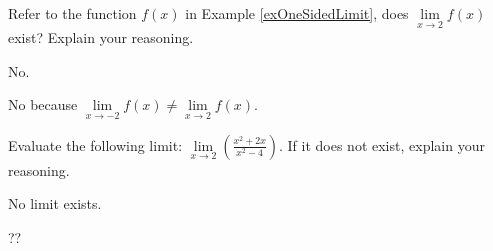
\begin{example}
Refer to the function $f(x)$ in Example \ref{exOneSidedLimit}, does $\lim\limits_{x \to 2}f(x)$ exist? Explain your reasoning.
    \begin{sol}
    No.
    \end{sol}
    \begin{solL}
    No because $\lim\limits_{x \to -2}f(x) \ne \lim\limits_{x \to 2}f(x)$.
    
    \end{solL}
\end{example}
\vspace{1.7in}
\begin{example}
Evaluate the following limit: \(\lim\limits_{x \to 2} \left(\displaystyle \frac{x^2+2x}{x^2-4}\right)\). If it does not exist, explain your reasoning.
    \begin{sol}
    No limit exists.
    \end{sol}
    \begin{solL}
    ??
    \end{solL}
\end{example}
\vspace{1.7in}
